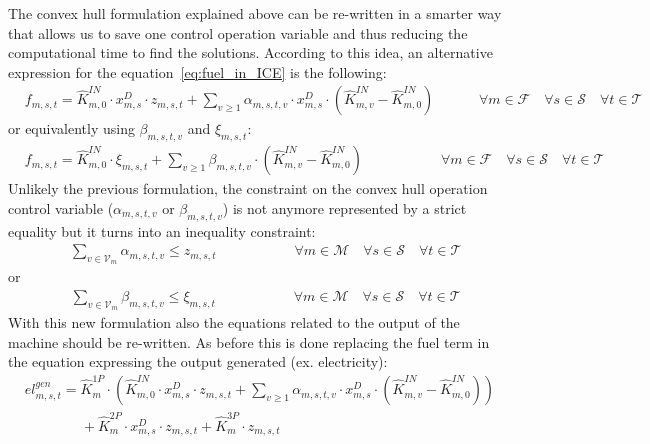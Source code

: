 \documentclass{article}
\newcommand{\cT}{{\mathcal T}}
\newcommand{\cM}{{\mathcal M}}
\newcommand{\cF}{{\mathcal F}}
\newcommand{\cS}{{\mathcal S}}
\newcommand{\cV}{{\mathcal V}}
\begin{document}
{The convex hull formulation explained above can be re-written in a smarter way that allows us to save one control operation variable and thus reducing the computational time to find the solutions. According to this idea, an alternative expression for the equation~\eqref{eq:fuel_in_ICE} is the following: 
\begin{align}
& f_{m,s,t} = \hat{K}_{m,0}^{IN} \cdot x_{m,s}^D \cdot z_{m,s,t} + \sum_{v \geq 1} \alpha_{m,s,t,v} \cdot x_{m,s}^D \cdot (\hat{K}_{m,v}^{IN}-\hat{K}_{m,0}^{IN}) & \hspace{1cm} \forall m \in \cF \quad \forall s \in \cS \quad \forall t \in \cT \label{eq:fuel_in_ICE_new}
\end{align}
or equivalently using $\beta_{m,s,t,v}$ and $\xi_{m,s,t}$:
\begin{align}
& f_{m,s,t} = \hat{K}_{m,0}^{IN} \cdot \xi_{m,s,t} + \sum_{v \geq 1} \beta_{m,s,t,v} \cdot (\hat{K}_{m,v}^{IN}-\hat{K}_{m,0}^{IN}) & \hspace{2cm} \forall m \in \cF \quad \forall s \in \cS \quad \forall t \in \cT \label{eq:fuel_in_ICE_new_2}
\end{align}
Unlikely the previous formulation, the constraint on the convex hull operation control variable ($\alpha_{m,s,t,v}$ or $\beta_{m,s,t,v}$) is not anymore represented by a strict equality but it turns into an inequality constraint:
\begin{align}
&\sum_{v \in \cV_m} \alpha_{m,s,t,v} \leq z_{m,s,t} & \hspace{2cm} \forall m \in \cM \quad \forall s \in \cS \quad \forall t \in \cT \label{eq:alpha_ICE_new}
\end{align}
or 
\begin{align}
&\sum_{v \in \cV_m} \beta_{m,s,t,v} \leq \xi_{m,s,t} & \hspace{2cm} \forall m \in \cM \quad \forall s \in \cS \quad \forall t \in \cT \label{eq:xi_ICE_new}
\end{align} 
With this new formulation also the equations related to the output of the machine should be re-written. As before this is done replacing the fuel term in the equation expressing the output generated (ex. electricity): 
\begin{equation}
\begin{split}
&el_{m,s,t}^{gen} = \hat{K}_{m}^{1P} \cdot \left( \hat{K}_{m,0}^{IN} \cdot x_{m,s}^D \cdot z_{m,s,t} + \sum_{v \geq 1} \alpha_{m,s,t,v} \cdot x_{m,s}^D \cdot (\hat{K}_{m,v}^{IN}-\hat{K}_{m,0}^{IN}) \right) \hspace{5cm} \\ & \qquad \qquad + \hat{K}_{m}^{2P} \cdot x_{m,s}^{D} \cdot z_{m,s,t} + \hat{K}_{m}^{3P} \cdot z_{m,s,t}

\end{split}
\end{equation}}
\end{document}
